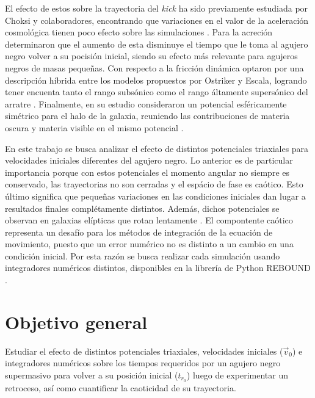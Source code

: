 	El efecto de estos sobre la trayectoria del \textit{kick} ha sido previamente estudiada por Choksi y colaboradores, encontrando que variaciones en el valor de la aceleraci\'on cosmol\'ogica tienen poco efecto sobre las simulaciones  \cite{choksi2017recoiling}. Para la acreci\'on determinaron que el aumento de esta disminuye el tiempo que le toma al agujero negro volver a su pocisi\'on inicial, siendo su efecto m\'as relevante para agujeros negros de masas peque\~nas. Con respecto a la fricci\'on din\'amica optaron por una descripci\'on h\'ibrida entre los modelos propuestos por Ostriker y Escala, logrando tener encuenta tanto el rango subs\'onico como el rango \'altamente supers\'onico del arratre \cite{ostriker1999dynamical, escala2005role}. Finalmente, en su estudio consideraron un potencial esf\'ericamente sim\'etrico para el halo de la galaxia, reuniendo las contribuciones de materia oscura y materia visible en el mismo potencial \cite{choksi2017recoiling}.
		
	En este trabajo se busca analizar el efecto de distintos potenciales triaxiales para velocidades iniciales diferentes del agujero negro. Lo anterior es de particular importancia porque con estos potenciales el momento angular no siempre es conservado, las trayectorias no son cerradas y el esp\'acio de fase es ca\'otico. Esto \'ultimo significa que pequeñas variaciones en las condiciones iniciales dan lugar a resultados finales compl\'etamente distintos. Adem\'as, dichos potenciales se observan en galaxias el\'ipticas que rotan lentamente \cite{buote2002chandra, binney1978elliptical}. El compontente ca\'otico representa un desaf\'io para los m\'etodos de integraci\'on de la ecuaci\'on de movimiento, puesto que un error num\'erico no es distinto a un cambio en una condici\'on inicial. Por esta raz\'on se busca realizar cada simulaci\'on usando integradores num\'ericos distintos, disponibles en la librer\'ia de Python REBOUND \cite{larson2017modeling}.
	
\section{Objetivo general}
	Estudiar el efecto de distintos potenciales triaxiales, velocidades iniciales ($\vec{v}_0$) e integradores num\'ericos sobre los tiempos requeridos por un agujero negro supermasivo para volver a su posici\'on inicial ($t_{r_0}$) luego de experimentar un retroceso, as\'i como cuantificar la caoticidad de su trayectoria.
	
